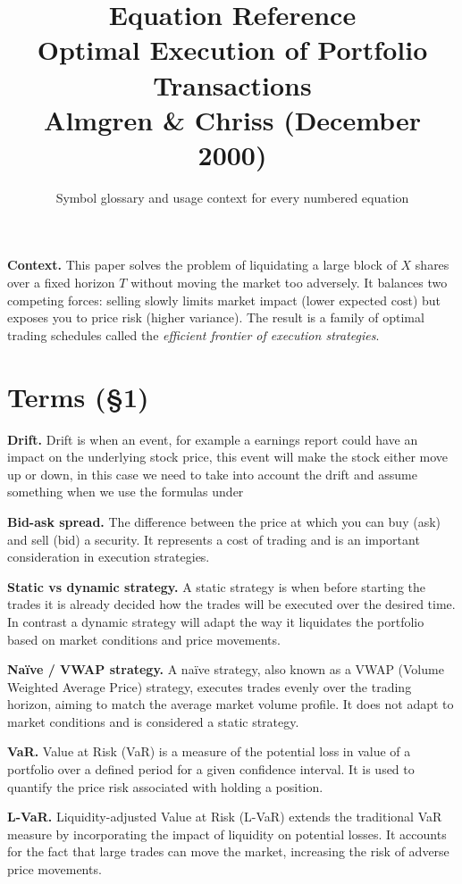 \documentclass[11pt,a4paper]{article}
\title{%
  \textbf{Equation Reference} \\[0.4em]
  \large Optimal Execution of Portfolio Transactions \\
  \normalsize Almgren \& Chriss (December 2000)
}
\author{Symbol glossary and usage context for every numbered equation}
\date{}
\begin{document}
\maketitle
\tableofcontents
\bigskip

\noindent\textbf{Context.} This paper solves the problem of liquidating a large block of $X$ shares over a fixed horizon $T$ without moving the market too adversely. It balances two competing forces: selling slowly limits market impact (lower expected cost) but exposes you to price risk (higher variance). The result is a family of optimal trading schedules called the \emph{efficient frontier of execution strategies}.
\section{Terms (\texorpdfstring{\S}{§}1)}

\noindent\textbf{Drift.} Drift is when an event, for example a earnings report could have an impact on the underlying stock price, this event will make the stock either move up or down, in this case we need to take into account the drift and assume something when we use the formulas under 

\noindent\textbf{Bid-ask spread.} The difference between the price at which you can buy (ask) and sell (bid) a security. It represents a cost of trading and is an important consideration in execution strategies.

\noindent\textbf{Static vs dynamic strategy.} A static strategy is when before starting the trades it is already decided how the trades will be executed over the desired time. In contrast a dynamic strategy will adapt the way it liquidates the portfolio based on market conditions and price movements. 

\noindent\textbf{Naïve / VWAP strategy.} A naïve strategy, also known as a VWAP (Volume Weighted Average Price) strategy, executes trades evenly over the trading horizon, aiming to match the average market volume profile. It does not adapt to market conditions and is considered a static strategy.

\noindent\textbf{VaR.} Value at Risk (VaR) is a measure of the potential loss in value of a portfolio over a defined period for a given confidence interval. It is used to quantify the price risk associated with holding a position.

\noindent\textbf{L-VaR.} Liquidity-adjusted Value at Risk (L-VaR) extends the traditional VaR measure by incorporating the impact of liquidity on potential losses. It accounts for the fact that large trades can move the market, increasing the risk of adverse price movements.
\end{document}
